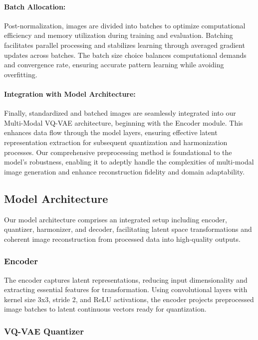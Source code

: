 \documentclass{article} %
\begin{document}
\paragraph{Batch Allocation:}

Post-normalization, images are divided into batches to optimize computational efficiency and memory utilization during training and evaluation. Batching facilitates parallel processing and stabilizes learning through averaged gradient updates across batches. The batch size choice balances computational demands and convergence rate, ensuring accurate pattern learning while avoiding overfitting.

\paragraph{Integration with Model Architecture:}

Finally, standardized and batched images are seamlessly integrated into our Multi-Modal VQ-VAE architecture, beginning with the Encoder module. This enhances data flow through the model layers, ensuring effective latent representation extraction for subsequent quantization and harmonization processes. Our comprehensive preprocessing method is foundational to the model's robustness, enabling it to adeptly handle the complexities of multi-modal image generation and enhance reconstruction fidelity and domain adaptability.

\subsection{Model Architecture}

Our model architecture comprises an integrated setup including encoder, quantizer, harmonizer, and decoder, facilitating latent space transformations and coherent image reconstruction from processed data into high-quality outputs.

\subsubsection{Encoder}

The encoder captures latent representations, reducing input dimensionality and extracting essential features for transformation. Using convolutional layers with kernel size 3x3, stride 2, and ReLU activations, the encoder projects preprocessed image batches to latent continuous vectors ready for quantization.

\subsubsection{VQ-VAE Quantizer}
\end{document}
